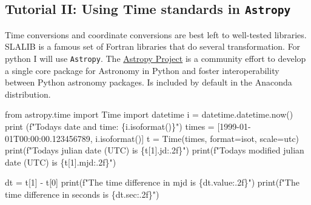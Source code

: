 \documentclass[
  letterpaper,
  DIV=11,
  numbers=noendperiod]{scrreprt}
\newenvironment{Shaded}{\begin{snugshade}}{\end{snugshade}}
\newcommand{\BuiltInTok}[1]{\textcolor[rgb]{0.00,0.23,0.31}{#1}}
\newcommand{\DecValTok}[1]{\textcolor[rgb]{0.68,0.00,0.00}{#1}}
\newcommand{\ImportTok}[1]{\textcolor[rgb]{0.00,0.46,0.62}{#1}}
\newcommand{\NormalTok}[1]{\textcolor[rgb]{0.00,0.23,0.31}{#1}}
\newcommand{\OperatorTok}[1]{\textcolor[rgb]{0.37,0.37,0.37}{#1}}
\newcommand{\SpecialCharTok}[1]{\textcolor[rgb]{0.37,0.37,0.37}{#1}}
\newcommand{\SpecialStringTok}[1]{\textcolor[rgb]{0.13,0.47,0.30}{#1}}
\newcommand{\StringTok}[1]{\textcolor[rgb]{0.13,0.47,0.30}{#1}}
\begin{document}
\subsection*{\texorpdfstring{Tutorial II: Using Time standards in
\texttt{Astropy}}{Tutorial II: Using Time standards in Astropy}}\label{tutorial-ii-using-time-standards-in-astropy}

Time conversions and coordinate conversions are best left to well-tested
libraries. SLALIB is a famous set of Fortran libraries that do several
transformation. For python I will use \texttt{Astropy}. The
\href{http://www.astropy.org/}{Astropy Project} is a community effort to
develop a single core package for Astronomy in Python and foster
interoperability between Python astronomy packages. Is included by
default in the Anaconda distribution.

\begin{Shaded}
\begin{Highlighting}[]
\ImportTok{from}\NormalTok{ astropy.time }\ImportTok{import}\NormalTok{ Time}
\ImportTok{import}\NormalTok{ datetime}
\NormalTok{i }\OperatorTok{=}\NormalTok{ datetime.datetime.now()}
\BuiltInTok{print}\NormalTok{ (}\SpecialStringTok{f"Today\textquotesingle{}s date and time: }\SpecialCharTok{\{}\NormalTok{i}\SpecialCharTok{.}\NormalTok{isoformat()}\SpecialCharTok{\}}\SpecialStringTok{"}\NormalTok{)}
\NormalTok{times }\OperatorTok{=}\NormalTok{ [}\StringTok{\textquotesingle{}1999{-}01{-}01T00:00:00.123456789\textquotesingle{}}\NormalTok{, i.isoformat()]}
\NormalTok{t }\OperatorTok{=}\NormalTok{ Time(times, }\BuiltInTok{format}\OperatorTok{=}\StringTok{\textquotesingle{}isot\textquotesingle{}}\NormalTok{, scale}\OperatorTok{=}\StringTok{\textquotesingle{}utc\textquotesingle{}}\NormalTok{)}
\BuiltInTok{print}\NormalTok{(}\SpecialStringTok{f"Today\textquotesingle{}s julian date (UTC) is }\SpecialCharTok{\{}\NormalTok{t[}\DecValTok{1}\NormalTok{]}\SpecialCharTok{.}\NormalTok{jd}\SpecialCharTok{:.2f\}}\SpecialStringTok{"}\NormalTok{)}
\BuiltInTok{print}\NormalTok{(}\SpecialStringTok{f"Today\textquotesingle{}s modified julian date (UTC) is }\SpecialCharTok{\{}\NormalTok{t[}\DecValTok{1}\NormalTok{]}\SpecialCharTok{.}\NormalTok{mjd}\SpecialCharTok{:.2f\}}\SpecialStringTok{"}\NormalTok{)}

\NormalTok{dt }\OperatorTok{=}\NormalTok{ t[}\DecValTok{1}\NormalTok{] }\OperatorTok{{-}}\NormalTok{ t[}\DecValTok{0}\NormalTok{]}
\BuiltInTok{print}\NormalTok{(}\SpecialStringTok{f"The time difference in mjd is }\SpecialCharTok{\{}\NormalTok{dt}\SpecialCharTok{.}\NormalTok{value}\SpecialCharTok{:.2f\}}\SpecialStringTok{"}\NormalTok{)}
\BuiltInTok{print}\NormalTok{(}\SpecialStringTok{f"The time difference in seconds is }\SpecialCharTok{\{}\NormalTok{dt}\SpecialCharTok{.}\NormalTok{sec}\SpecialCharTok{:.2f\}}\SpecialStringTok{"}\NormalTok{)}
\end{Highlighting}
\end{Shaded}
\end{document}
